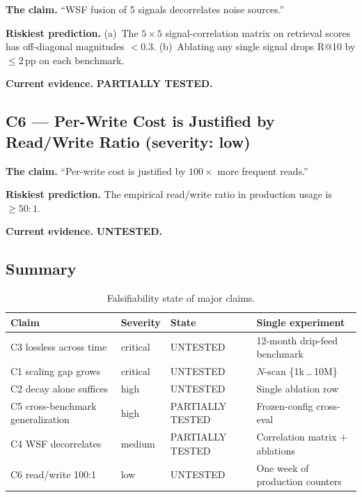 \documentclass[11pt]{article}
\begin{document}
\textbf{The claim.} ``WSF fusion of 5 signals decorrelates noise
sources.''

\textbf{Riskiest prediction.}  (a)~The $5 \times 5$
signal-correlation matrix on retrieval scores has off-diagonal
magnitudes $< 0.3$.  (b)~Ablating any single signal drops R@10 by
$\le 2$\,pp on each benchmark.

\textbf{Current evidence.} \textbf{PARTIALLY TESTED.}

\subsection{C6 --- Per-Write Cost is Justified by Read/Write Ratio (severity: low)}
\label{app:popper-c6}

\textbf{The claim.} ``Per-write cost is justified by $100\times$
more frequent reads.''

\textbf{Riskiest prediction.}  The empirical read/write ratio in
production usage is $\ge 50:1$.

\textbf{Current evidence.} \textbf{UNTESTED.}

\subsection{Summary}
\label{app:popper-summary}

\begin{table}[h]
\centering
\caption{Falsifiability state of major claims.}
\label{tab:popper-summary}
\small
\begin{tabular}{llll}
\toprule
Claim & Severity & State & Single experiment \\
\midrule
C3 lossless across time         & critical & UNTESTED         & 12-month drip-feed benchmark \\
C1 scaling gap grows            & critical & UNTESTED         & $N$-scan \{1k\,\dots\,10M\} \\
C2 decay alone suffices         & high     & UNTESTED         & Single ablation row \\
C5 cross-benchmark generalization & high   & PARTIALLY TESTED & Frozen-config cross-eval \\
C4 WSF decorrelates            & medium   & PARTIALLY TESTED & Correlation matrix $+$ ablations \\
C6 read/write 100:1             & low      & UNTESTED         & One week of production counters \\
\bottomrule
\end{tabular}
\end{table}
\end{document}
